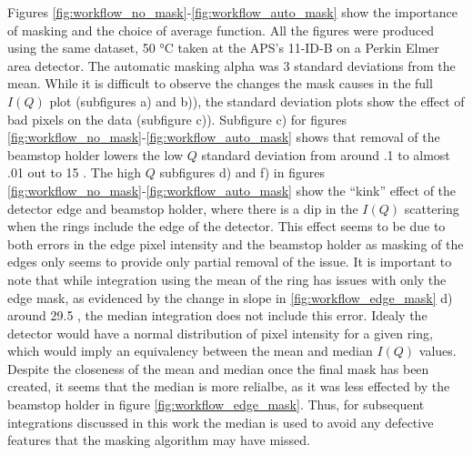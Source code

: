 Figures \ref{fig:workflow_no_mask}-\ref{fig:workflow_auto_mask} show the importance of masking and the choice of average function.
All the figures were produced using the same dataset, 50 \si{\degree}C  taken at the APS's 11-ID-B on a Perkin Elmer area detector.
The automatic masking alpha was $3$ standard deviations from the mean.
While it is difficult to observe the changes the mask causes in the full $I(Q)$ plot (subfigures a) and b)), the standard deviation plots show the effect of bad pixels on the data (subfigure c)).
Subfigure c) for figures \ref{fig:workflow_no_mask}-\ref{fig:workflow_auto_mask} shows that removal of the beamstop holder lowers the low $Q$ standard deviation from around .1 to almost .01 out to 15 \iA.
The high $Q$ subfigures d) and f) in figures \ref{fig:workflow_no_mask}-\ref{fig:workflow_auto_mask} show the ``kink'' effect of the detector edge and beamstop holder, where there is a dip in the $I(Q)$ scattering when the rings include the edge of the detector.
This effect seems to be due to both errors in the edge pixel intensity and the beamstop holder as masking of the edges only seems to provide only partial removal of the issue.
It is important to note that while integration using the mean of the ring has issues with only the edge mask, as evidenced by the change in slope in \ref{fig:workflow_edge_mask} d) around 29.5 \iA, the median integration does not include this error.
Idealy the detector would have a normal distribution of pixel intensity for a given ring, which would imply an equivalency between the mean and median $I(Q)$ values.
Despite the closeness of the mean and median once the final mask has been created, it seems that the median is more relialbe, as it was less effected by the beamstop holder in figure \ref{fig:workflow_edge_mask}.
Thus, for subsequent integrations discussed in this work the median is used to avoid any defective features that the masking algorithm may have missed.